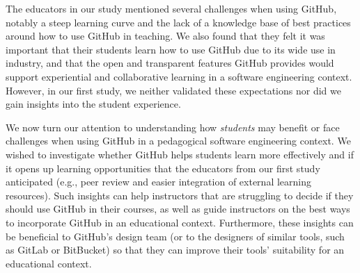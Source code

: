 The educators in our study mentioned several challenges when using GitHub, notably a steep learning curve and the lack of a knowledge base of best practices around how to use GitHub in teaching. We also found that they felt it was important that their students learn how to use GitHub due to its wide use in industry, and that the open and transparent features GitHub provides would support experiential and collaborative learning in a software engineering context. However, in our first study, we neither validated these expectations nor did we gain insights into the student experience.

We now turn our attention to understanding how \emph{students} may benefit or face challenges when using GitHub in a pedagogical software engineering context. We wished to investigate whether GitHub helps students learn more effectively and if it opens up learning opportunities that the educators from our first study anticipated (e.g., peer review and easier integration of external learning resources). Such insights can help instructors that are struggling to decide if they should use GitHub in their courses, as well as guide instructors on the best ways to incorporate GitHub in an educational context. Furthermore, these insights can be beneficial to GitHub's design team (or to the designers of similar tools, such as GitLab or BitBucket) so that they can improve their tools' suitability for an educational context.




